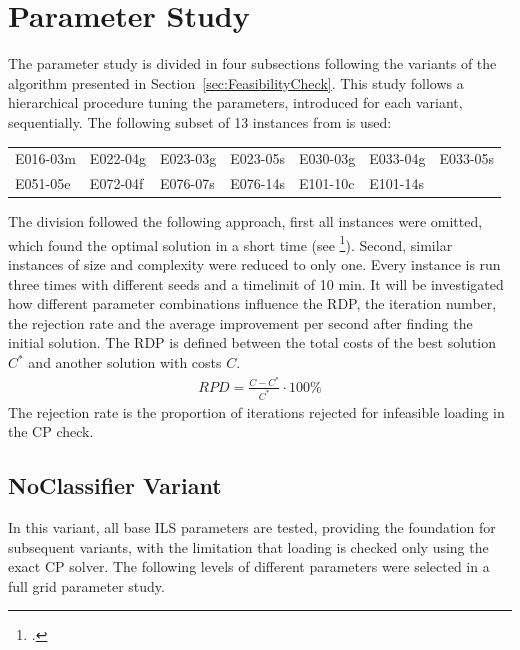 \section{Parameter Study}
\label{sec:parameter_study}

The parameter study is divided in four subsections following the variants of the algorithm
presented in Section~\ref{sec:FeasibilityCheck}. This study follows a hierarchical procedure
tuning the parameters, introduced for each variant, sequentially. The following subset of 13
instances from \gendreauDataSetText is used:


\begin{table}[ht]
  \centering
  \setlength{\tabcolsep}{0.75em}
  \def\arraystretch{1.5}
  \begin{tabular}{lllllll}
    E016-03m & E022-04g & E023-03g & E023-05s & E030-03g & E033-04g & E033-05s \\
    E051-05e & E072-04f & E076-07s & E076-14s & E101-10c & E101-14s &          \\
  \end{tabular}
\end{table}

The division followed the following approach, first all instances were omitted, which found
the optimal solution in a short time (see \cite{tamke_branch-and-cut_2024}\footcite[cf.][p.26]{tamke_branch-and-cut_2024}). Second, similar instances of size and complexity were reduced to only one.
Every instance is run three times with different seeds and a timelimit of 10 min. It will be investigated
how different parameter combinations influence the \gls{RDP}, the iteration number, the rejection rate and
the average improvement per second after finding the initial solution. The \gls{RDP} is defined between the
total costs of the best solution $C^*$ and another solution with costs $C$.
\begin{align}
  RPD = \frac{C - C^*}{C^*} \cdot 100\%
\end{align}
The rejection rate is the proportion of iterations rejected for infeasible loading in the CP check.

\subsection{NoClassifier Variant}
\label{subsec_parameterStuy_noclassifier}
In this variant, all base \gls{ILS} parameters are tested, providing the foundation for subsequent variants,
with the limitation that loading is checked only using the exact \gls{CP} solver. The following levels of
different parameters were selected in a full grid parameter study.

